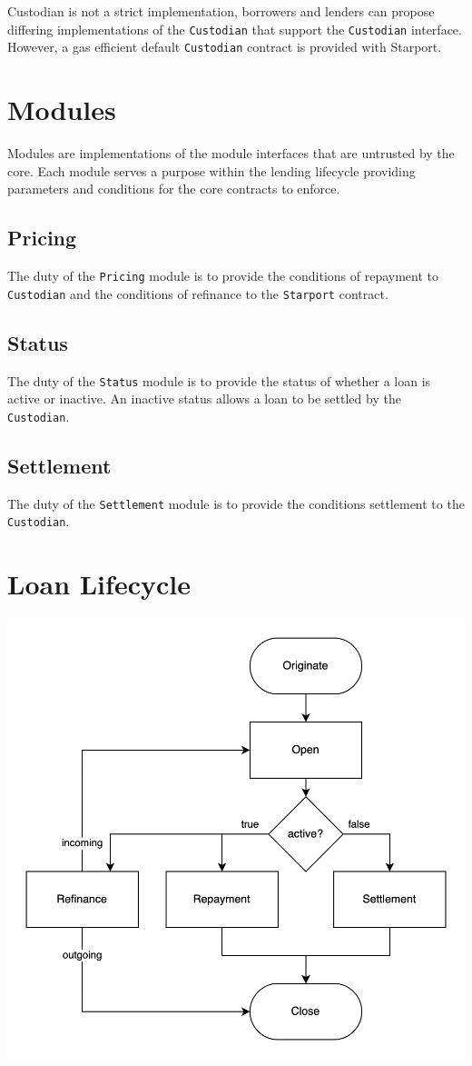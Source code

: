 \documentclass[12pt]{article}
\begin{document}
Custodian is not a strict implementation, borrowers and lenders can propose differing implementations of the \texttt{Custodian} that support the \texttt{Custodian} interface. However, a gas efficient default \texttt{Custodian} contract is provided with Starport.

\section{Modules}
Modules are implementations of the module interfaces that are untrusted by the core. Each module serves a purpose within the lending lifecycle providing parameters and conditions for the core contracts to enforce.
\subsection{Pricing}
The duty of the \texttt{Pricing} module is to provide the conditions of repayment to \texttt{Custodian} and the conditions of refinance to the \texttt{Starport} contract.
\subsection{Status}
The duty of the \texttt{Status} module is to provide the status of whether a loan is active or inactive. An inactive status allows a loan to be settled by the \texttt{Custodian}.
\subsection{Settlement}
The duty of the \texttt{Settlement} module is to provide the conditions settlement to the \texttt{Custodian}.
\section{Loan Lifecycle}
\includegraphics[width=\textwidth]{loan_lifecycle.png}
\end{document}
